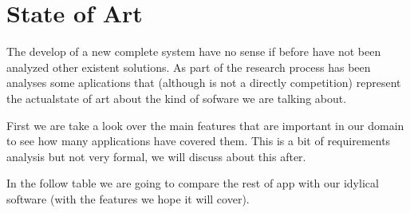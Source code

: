 \section{State of Art }

The develop of a new complete system have no sense if before have not been
analyzed other existent solutions. As part of the research process has been
analyses some aplications that (although is not a directly competition) represent
the actualstate of art about the kind of sofware we are talking about.

First we are take a look over the main features that are important in our domain
to see how many applications have covered them. This is a bit of requirements
analysis but not very formal, we will discuss about this after.

In the follow table we are going to compare the rest of app with our idylical
software (with the features we hope it will cover).

